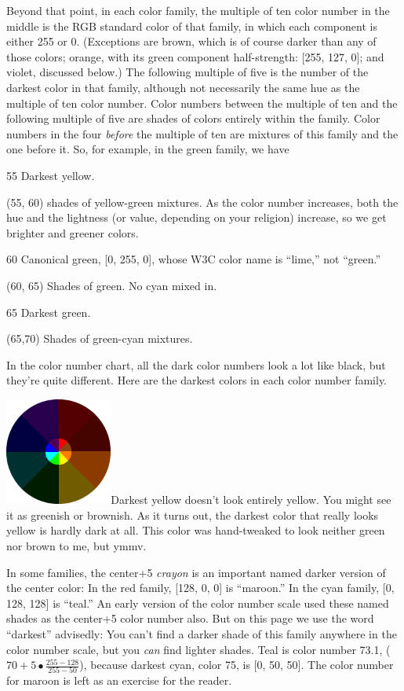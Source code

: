 Beyond that point, in each color family, the multiple of ten color
number in the middle is the RGB standard color of that family, in which
each component is either 255 or 0. (Exceptions are brown, which is of
course darker than any of those colors; orange, with its green component
half-strength: {[}255, 127, 0{]}; and violet, discussed below.) The
following multiple of five is the number of the darkest color in that
family, although not necessarily the same hue as the multiple of ten
color number. Color numbers between the multiple of ten and the
following multiple of five are shades of colors entirely within the
family. Color numbers in the four \emph{before} the multiple of ten are
mixtures of this family and the one before it. So, for example, in the
green family, we have

55 Darkest yellow.

(55, 60) shades of yellow-green mixtures. As the color number increases,
both the hue and the lightness (or value, depending on your religion)
increase, so we get brighter and greener colors.

60 Canonical green, {[}0, 255, 0{]}, whose W3C color name is ``lime,''
not ``green.''

(60, 65) Shades of green. No cyan mixed in.

65 Darkest green.

(65,70) Shades of green-cyan mixtures.

In the color number chart, all the dark color numbers look a lot like
black, but they're quite different. Here are the darkest colors in each
color number family.

\includegraphics[width=1.38889in,height=1.38889in]{media/image1261.png}Darkest
yellow doesn't look entirely yellow. You might see it as greenish or
brownish. As it turns out, the darkest color that really looks yellow is
hardly dark at all. This color was hand-tweaked to look neither green
nor brown to me, but ymmv.

In some families, the center+5 \emph{crayon} is an important named
darker version of the center color: In the red family, {[}128, 0, 0{]}
is ``maroon.'' In the cyan family, {[}0, 128, 128{]} is ``teal.'' An
early version of the color number scale used these named shades as the
center+5 color number also. But on this page we use the word ``darkest''
advisedly: You can't find a darker shade of this family anywhere in the
color number scale, but you \emph{can} find lighter shades. Teal is
color number 73.1, (\(70 + 5 \bullet \frac{255 - 128}{255 - 50}\)),
because darkest cyan, color 75, is {[}0, 50, 50{]}. The color number for
maroon is left as an exercise for the reader.

